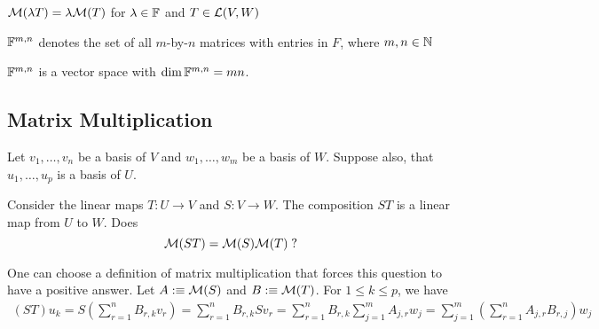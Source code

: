 \setcounter{thm}{37}
\begin{thm}
  $\mathcal{M}(\lambda T) = \lambda \mathcal{M}(T)$ for $\lambda \in \mathbb{F}$ and $T \in \mathcal{L} (V,W)$
\end{thm}

\begin{mydef} 
  $\mathbb{F}^{m,n}$ denotes the set of all $m$-by-$n$ matrices with entries in $F$, where $m,n \in \mathbb{N}$
\end{mydef}

\begin{thm} %
  $\mathbb{F}^{m,n}$ is a vector space with $\dim \mathbb{F}^{m,n}=mn$.
\end{thm}


\subsection{Matrix Multiplication}

Let $v_1, \ldots, v_n$ be a basis of $V$ and $w_1, \ldots, w_m$ be a basis of $W.$ Suppose also, that $u_1, \ldots, u_p$ is a basis of $U$.

Consider the linear maps $T: U \to V$ and $S: V \to W$. The composition $ST$ is a linear map from $U$ to $W$. Does
\begin{equation}
  \mathcal{M}(ST) = \mathcal{M}(S) \mathcal{M}(T) \;?
\end{equation}

One can choose a definition of matrix multiplication that forces this question to have a positive answer. Let $A :\equiv \mathcal{M}(S)$ and $B :\equiv \mathcal{M}(T)$. For $1 \leq k \leq p$, we have
\begin{equation}
  \begin{aligned}
    (ST) u_k 
    = S \left ( \sum_{r=1}^{n} B_{r,k} v_r \right )
    =  \sum_{r=1}^{n} B_{r,k} S v_r 
    =  \sum_{r=1}^{n} B_{r,k} \sum_{j=1}^{m} A_{j,r}  w_j 
    =  \sum_{j=1}^{m} \left( \sum_{r=1}^{n} A_{j,r}  B_{r,j} \right) w_j 
  \end{aligned}
\end{equation}

